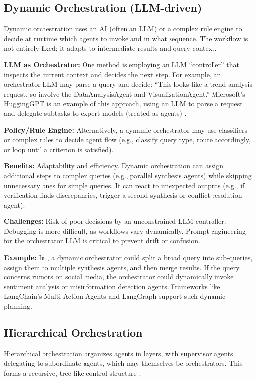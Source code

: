 \subsection{Dynamic Orchestration (LLM-driven)}
Dynamic orchestration uses an AI (often an LLM) or a complex rule engine to decide at runtime which agents to invoke and in what sequence. The workflow is not entirely fixed; it adapts to intermediate results and query context.  

\textbf{LLM as Orchestrator:} One method is employing an LLM “controller” that inspects the current context and decides the next step. For example, an orchestrator LLM may parse a query and decide: “This looks like a trend analysis request, so involve the DataAnalysisAgent and VisualizationAgent.” Microsoft’s HuggingGPT is an example of this approach, using an LLM to parse a request and delegate subtasks to expert models (treated as agents) \cite{awsOrchestration}.  

\textbf{Policy/Rule Engine:} Alternatively, a dynamic orchestrator may use classifiers or complex rules to decide agent flow (e.g., classify query type, route accordingly, or loop until a criterion is satisfied).  

\textbf{Benefits:} Adaptability and efficiency. Dynamic orchestration can assign additional steps to complex queries (e.g., parallel synthesis agents) while skipping unnecessary ones for simple queries. It can react to unexpected outputs (e.g., if verification finds discrepancies, trigger a second synthesis or conflict-resolution agent).  

\textbf{Challenges:} Risk of poor decisions by an unconstrained LLM controller. Debugging is more difficult, as workflows vary dynamically. Prompt engineering for the orchestrator LLM is critical to prevent drift or confusion.  

\textbf{Example:} In \ishtar{}, a dynamic orchestrator could split a broad query into sub-queries, assign them to multiple synthesis agents, and then merge results. If the query concerns rumors on social media, the orchestrator could dynamically invoke sentiment analysis or misinformation detection agents. Frameworks like LangChain's Multi-Action Agents \cite{blogLangChain} and LangGraph \cite{langchain} support such dynamic planning.  

\subsection{Hierarchical Orchestration}
Hierarchical orchestration organizes agents in layers, with supervisor agents delegating to subordinate agents, which may themselves be orchestrators. This forms a recursive, tree-like control structure \cite{blogLangChain2}.  

